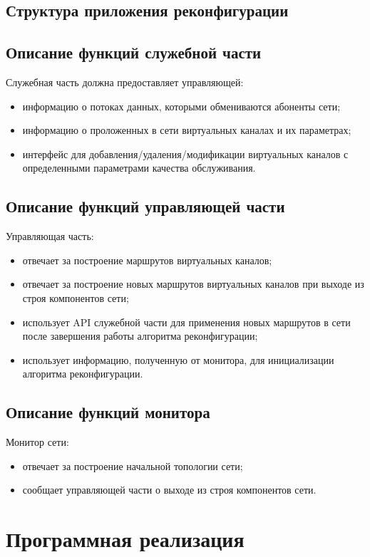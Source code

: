 \documentclass[12pt, a4paper]{article}
\begin{document}
\subsection{Структура приложения реконфигурации}


\subsection{Описание функций служебной части}
Служебная часть должна предоставляет управляющей:
\begin{itemize}
	\item информацию о потоках данных, которыми обмениваются абоненты сети;
	\item информацию о проложенных в сети виртуальных каналах и их параметрах;
	\item интерфейс для добавления/удаления/модификации виртуальных каналов с определенными параметрами качества обслуживания.
\end{itemize}

\subsection{Описание функций управляющей части}
Управляющая часть:
\begin{itemize}
	\item отвечает за построение маршрутов виртуальных каналов;
	\item отвечает за построение новых маршрутов виртуальных каналов при выходе из строя компонентов сети;
	\item использует API служебной части для применения новых маршрутов в сети после завершения работы алгоритма реконфигурации;
	\item использует информацию, полученную от монитора, для инициализации алгоритма реконфигурации.
\end{itemize}
\subsection{Описание функций монитора}
Монитор сети:
\begin{itemize}
	\item отвечает за построение начальной топологии сети;
	\item сообщает управляющей части о выходе из строя компонентов сети.
\end{itemize}


\section{Программная реализация}
\end{document}
